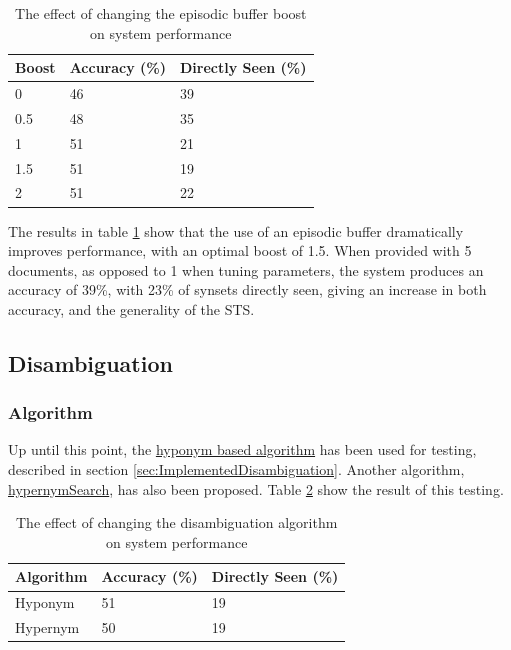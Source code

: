 \documentclass[]{article}
\begin{document}
\begin{table}
\begin{center}
\begin{tabular}{|p{2em}|p{7em}|p{7em}|}
	\hline
	Boost & Accuracy (\%) & Directly Seen (\%) \\
	\hline
	0 & 46 & 39\\
	\hline
	0.5 & 48 & 35\\
	\hline
	1 & 51 & 21\\
	\hline
	1.5 & 51 & 19\\
	\hline
	2 & 51 & 22\\
	\hline
\end{tabular}
\end{center}
\caption{The effect of changing the episodic buffer boost on system performance}
\label{table:EBboost}
\end{table}

The results in table \ref{table:EBboost} show that the use of an episodic buffer dramatically improves performance, with an optimal boost of 1.5. When provided with 5 documents, as opposed to 1 when tuning parameters, the system produces an accuracy of 39\%, with 23\% of synsets directly seen, giving an increase in both accuracy, and the generality of the STS. 

\subsection{Disambiguation}
\label{sec:EvDisambiguation}


\subsubsection{Algorithm}
\label{sec:EvDisAlgorithm}
Up until this point, the \hyperref[lst:hyponymSearch]{hyponym based algorithm} has been used for testing, described in section \ref{sec:ImplementedDisambiguation}. Another algorithm, \hyperref[lst:hypernymSearch]{hypernymSearch}, has also been proposed. Table \ref{table:Algorithm} show the result of this testing.

\begin{table}
\begin{center}
\begin{tabular}{|p{7em}|p{7em}|p{7em}|}
	\hline
	Algorithm & Accuracy (\%) & Directly Seen (\%) \\
	\hline
	Hyponym & 51 & 19\\
	\hline
	Hypernym & 50 & 19\\
	\hline
\end{tabular}
\end{center}
\caption{The effect of changing the disambiguation algorithm on system performance}
\label{table:Algorithm}
\end{table}
\end{document}

